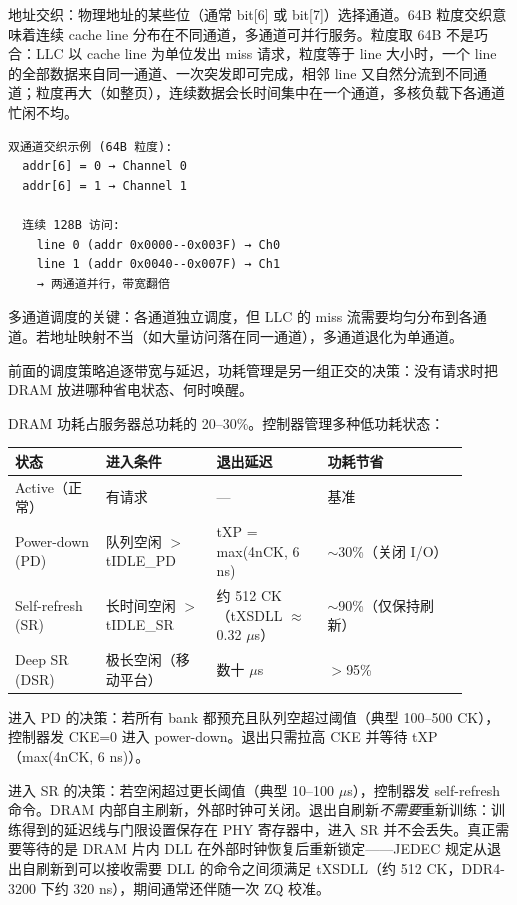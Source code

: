 地址交织：物理地址的某些位（通常 bit[6] 或 bit[7]）选择通道。64B 粒度交织意味着连续 cache line 分布在不同通道，多通道可并行服务。粒度取 64B 不是巧合：LLC 以 cache line 为单位发出 miss 请求，粒度等于 line 大小时，一个 line 的全部数据来自同一通道、一次突发即可完成，相邻 line 又自然分流到不同通道；粒度再大（如整页），连续数据会长时间集中在一个通道，多核负载下各通道忙闲不均。

\begin{lstlisting}
双通道交织示例 (64B 粒度):
  addr[6] = 0 → Channel 0
  addr[6] = 1 → Channel 1

  连续 128B 访问:
    line 0 (addr 0x0000--0x003F) → Ch0
    line 1 (addr 0x0040--0x007F) → Ch1
    → 两通道并行，带宽翻倍
\end{lstlisting}

多通道调度的关键：各通道独立调度，但 LLC 的 miss 流需要均匀分布到各通道。若地址映射不当（如大量访问落在同一通道），多通道退化为单通道。


前面的调度策略追逐带宽与延迟，功耗管理是另一组正交的决策：没有请求时把 DRAM 放进哪种省电状态、何时唤醒。

DRAM 功耗占服务器总功耗的 20--30\%。控制器管理多种低功耗状态：

\begin{longtable}{L{0.18\linewidth}L{0.22\linewidth}L{0.22\linewidth}L{0.28\linewidth}}
\toprule
状态 & 进入条件 & 退出延迟 & 功耗节省 \\
\midrule
Active（正常） & 有请求 & — & 基准 \\
Power-down (PD) & 队列空闲 $>$ tIDLE\_PD & tXP = max(4nCK, 6 ns) & $\sim$30\%（关闭 I/O） \\
Self-refresh (SR) & 长时间空闲 $>$ tIDLE\_SR & 约 512 CK（tXSDLL $\approx$ 0.32 $\mu$s） & $\sim$90\%（仅保持刷新） \\
Deep SR (DSR) & 极长空闲（移动平台） & 数十 $\mu$s & $>$95\% \\
\bottomrule
\end{longtable}

进入 PD 的决策：若所有 bank 都预充且队列空超过阈值（典型 100--500 CK），控制器发 CKE=0 进入 power-down。退出只需拉高 CKE 并等待 tXP（max(4nCK, 6 ns)）。

进入 SR 的决策：若空闲超过更长阈值（典型 10--100 $\mu$s），控制器发 self-refresh 命令。DRAM 内部自主刷新，外部时钟可关闭。退出自刷新\emph{不需要}重新训练：训练得到的延迟线与门限设置保存在 PHY 寄存器中，进入 SR 并不会丢失。真正需要等待的是 DRAM 片内 DLL 在外部时钟恢复后重新锁定——JEDEC 规定从退出自刷新到可以接收需要 DLL 的命令之间须满足 tXSDLL（约 512 CK，DDR4-3200 下约 320 ns），期间通常还伴随一次 ZQ 校准。

